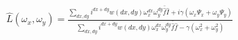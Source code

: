 \documentclass{article}
\begin{document}
$\hat{L}(\omega_x, \omega_y) = \frac{ \sum\limits_{dx, dy} i^{dx + dy} w(dx, dy) \omega_x^{dx} \omega_y^{dy} \bar{\hat{f}} \hat{I} + i \gamma (\omega_x \Psi_x + \omega_y \Psi_y) } { \sum\limits_{dx, dy} i^{dx + dy} w(dx, dy) \omega_x^{dx} \omega_y^{dy} \bar{\hat{f}} \hat{f} - \gamma (\omega_x^2 + \omega_y^2)
 } $
\end{document}
